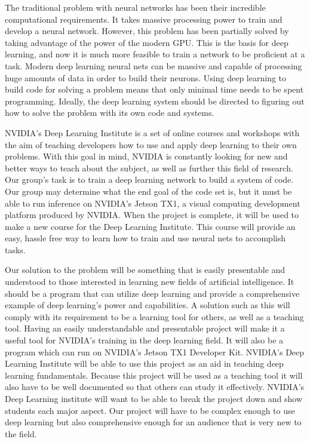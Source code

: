 \documentclass[letterpaper,10pt]{article}
\begin{document}
The traditional problem with neural networks has been their incredible computational requirements. It takes massive processing power to train and develop a neural network. However, this problem has been partially solved by taking advantage of the power of the modern GPU. This is the basis for deep learning, and now it is much more feasible to train a network to be proficient at a task. Modern deep learning neural nets can be massive and capable of processing huge amounts of data in order to build their neurons. Using deep learning to build code for solving a problem means that only minimal time needs to be spent programming. Ideally, the deep learning system should be directed to figuring out how to solve the problem with its own code and systems.
 
NVIDIA’s Deep Learning Institute is a set of online courses and workshops with the aim of teaching developers how to use and apply deep learning to their own problems. With this goal in mind, NVIDIA is constantly looking for new and better ways to teach about the subject, as well as further this field of research. Our group’s task is to train a deep learning network to build a system of code. Our group may determine what the end goal of the code set is, but it must be able to run inference on NVIDIA’s Jetson TX1, a visual computing development platform produced by NVIDIA. When the project is complete, it will be used to make a new course for the Deep Learning Institute. This course will provide an easy, hassle free way to learn how to train and use neural nets to accomplish tasks.  

Our solution to the problem will be something that is easily presentable and understood to those interested in learning new fields of artificial intelligence. It should be a program that can utilize deep learning and provide a comprehensive example of deep learning's power and capabilities. A solution such as this will comply with its requirement to be a learning tool for others, as well as a teaching tool. Having an easily understandable and presentable project will make it a useful tool for NVIDIA's training in the deep learning field. It will also be a program which can run on NVIDIA's Jetson TX1 Developer Kit. NVIDIA's Deep Learning Institute will be able to use this project as an aid in teaching deep learning fundamentals. Because this project will be used as a teaching tool it will also have to be well documented so that others can study it effectively. NVIDIA's Deep Learning institute will want to be able to break the project down and show students each major aspect. Our project will have to be complex enough to use deep learning but also comprehensive enough for an audience that is very new to the field.  
\end{document}
